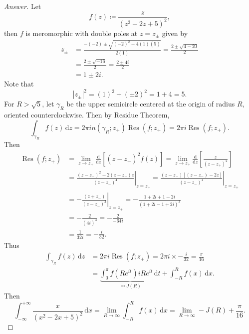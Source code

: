 \documentclass[12pt]{article}
\newcommand\paren[1]{\left( #1 \right)}
\newcommand{\sqbrack}[1]{\left [ #1 \right ]}
\newcommand{\abs}[1]{\left| #1 \right|}
\renewcommand{\i}[4]{\int_{#1}^{#2} {#3} \, \mathrm{d} {#4} }
\newcommand{\rd}{\mathrm{d}}
\theoremstyle{definition}
\DeclareMathOperator\Res{Res}
\begin{document}
\begin{proof}[Answer]
    Let 
    \[
        f(z) \coloneqq \frac{z}{ \paren{ z^2 - 2z + 5 }^2 } ,
    \]
    then $f$ is meromorphic with double poles at $z = z_{\pm}$ given by 
    \begin{align*}
        z_{\pm} & = \frac{-(-2) \pm \sqrt{ (-2)^2 - 4(1)(5) } }{2(1)} = \frac{2 \pm \sqrt{4 - 20}}{2} \\ 
        & = \frac{2 \pm \sqrt{-16} }{2} = \frac{2 \pm 4i}{2} \\ 
        & = 1 \pm 2i . 
    \end{align*}
    Note that 
    \[
        \abs{ z_{\pm} }^2 = (1)^2 + (\pm2)^2 = 1 + 4 = 5 . 
    \]
    For $R > \sqrt{5}$, let $\gamma_R$ be the upper semicircle centered at the origin of radius $R$, oriented counterclockwise. Then by Residue Theorem, 
    \[
        \i{\gamma_R}{}{f(z)}{z} = 2\pi i n \paren{ \gamma_R ; z_{+} } \Res \paren{ f ; z_{+} } = 2\pi i \Res \paren{ f ; z_{+} }.
    \]
    Then 
    \begin{align*}
        \Res \paren{ f ; z_{+} } & = \lim\limits_{z \to z_+} \frac{\rd}{\rd z} \sqbrack{ \paren{ z - z_+ }^2 f(z) } = \lim\limits_{z \to z_+} \frac{\rd}{\rd z} \sqbrack{ \frac{z}{ \paren{ z - z_{+} }^2 } } \\ 
        & = \left. \frac{ \paren{ z - z_{-} }^2 - 2 \paren{ z - z_{-} } z }{ \paren{ z - z_{-} }^4 } \right|_{z = z_{+}} = \left. \frac{ \paren{ z - z_{-} } \sqbrack{  \paren{ z - z_{-} } - 2z } }{ \paren{ z - z_{-} }^4 } \right|_{z = z_{+}} \\ 
        & = \left. - \frac{ \paren{ z + z_{-} } }{ \paren{ z - z_{-} }^3 } \right|_{z = z_{+}} = -\frac{ 1 + 2i + 1 - 2i }{ \paren{ 1 + 2i - 1 + 2i }^3 } \\ 
        & = - \frac{2}{ \paren{ 4i }^3 } = - \frac{2}{-64i} \\ 
        & = \frac{1}{32i} = -\frac{i}{32} . 
    \end{align*}
    Thus 
    \begin{align*}
        \i{\gamma_R}{}{f(z)}{z} & = 2\pi i \Res \paren{ f ; z_{+} } = 2\pi i \times -\frac{i}{32} = \frac{\pi}{16} \\ 
        & = \underbrace{ \i{0}{\pi}{ f \paren{ Re^{it} } i R e^{it} }{t} }_{ \eqqcolon J(R) } + \i{-R}{R}{f(x)}{x} . 
    \end{align*}
    Then 
    \[
        \i{-\infty}{+\infty}{ \frac{x}{\paren{x^2 - 2x + 5 }^2} }{x} = \lim\limits_{R \to \infty} \i{-R}{R}{f(x)}{x} = \lim\limits_{R \to \infty} -J(R) + \frac{\pi}{16} . 
    \]

\end{proof}
\end{document}
